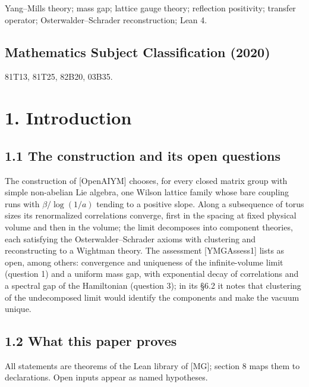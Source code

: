 \documentclass[10pt,letterpaper,twocolumn]{article}
\begin{document}
Yang--Mills theory; mass gap; lattice gauge theory; reflection positivity; transfer operator; Osterwalder--Schrader reconstruction; Lean 4.

\subsection{Mathematics Subject Classification (2020)}\label{mathematics-subject-classification-2020}

81T13, 81T25, 82B20, 03B35.

\section{1. Introduction}\label{1-introduction}

\subsection{1.1 The construction and its open questions}\label{11-the-construction-and-its-open-questions}

The construction of {[}OpenAIYM{]} chooses, for every closed matrix group with simple non-abelian Lie algebra, one Wilson lattice family whose bare coupling runs with \(\beta/\log(1/a)\) tending to a positive slope. Along a subsequence of torus sizes its renormalized correlations converge, first in the spacing at fixed physical volume and then in the volume; the limit decomposes into component theories, each satisfying the Osterwalder--Schrader axioms with clustering and reconstructing to a Wightman theory. The assessment {[}YMGAssess1{]} lists as open, among others: convergence and uniqueness of the infinite-volume limit (question 1) and a uniform mass gap, with exponential decay of correlations and a spectral gap of the Hamiltonian (question 3); in its §6.2 it notes that clustering of the undecomposed limit would identify the components and make the vacuum unique.

\subsection{1.2 What this paper proves}\label{12-what-this-paper-proves}

All statements are theorems of the Lean library of {[}MG{]}; section 8 maps them to declarations. Open inputs appear as named hypotheses.
\end{document}
